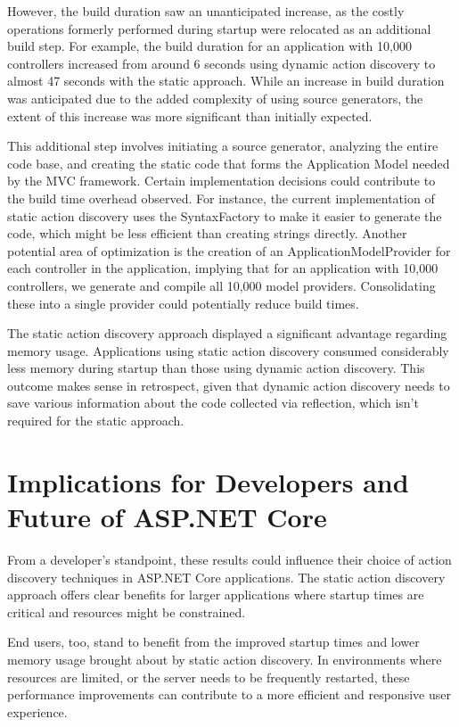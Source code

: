However, the build duration saw an unanticipated increase, as the costly operations formerly performed during startup were relocated as an additional build step. For example, the build duration for an application with 10,000 controllers increased from around 6 seconds using dynamic action discovery to almost 47 seconds with the static approach. While an increase in build duration was anticipated due to the added complexity of using source generators, the extent of this increase was more significant than initially expected.

This additional step involves initiating a source generator, analyzing the entire code base, and creating the static code that forms the Application Model needed by the MVC framework. Certain implementation decisions could contribute to the build time overhead observed. For instance, the current implementation of static action discovery uses the SyntaxFactory to make it easier to generate the code, which might be less efficient than creating strings directly. Another potential area of optimization is the creation of an ApplicationModelProvider for each controller in the application, implying that for an application with 10,000 controllers, we generate and compile all 10,000 model providers. Consolidating these into a single provider could potentially reduce build times.

The static action discovery approach displayed a significant advantage regarding memory usage. Applications using static action discovery consumed considerably less memory during startup than those using dynamic action discovery. This outcome makes sense in retrospect, given that dynamic action discovery needs to save various information about the code collected via reflection, which isn't required for the static approach.

\section{Implications for Developers and Future of ASP.NET Core}

From a developer's standpoint, these results could influence their choice of action discovery techniques in ASP.NET Core applications. The static action discovery approach offers clear benefits for larger applications where startup times are critical and resources might be constrained.

End users, too, stand to benefit from the improved startup times and lower memory usage brought about by static action discovery. In environments where resources are limited, or the server needs to be frequently restarted, these performance improvements can contribute to a more efficient and responsive user experience.

